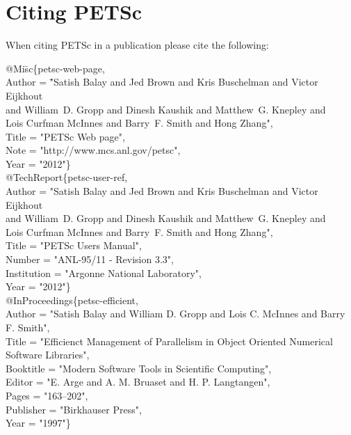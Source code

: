 
\section{Citing PETSc}

When citing PETSc in a publication please cite the following:
\begin{tabbing}

@Mi\=sc\{petsc-web-page,\\
   \>Author = \= "Satish Balay and Jed Brown and Kris Buschelman and Victor Eijkhout \\
\> \> and William~D. Gropp and Dinesh Kaushik and Matthew~G. Knepley and \\
\> \> Lois Curfman McInnes and Barry~F. Smith and Hong Zhang",\\
   \>Title  = "{PETS}c {W}eb page",\\
   \>Note   = "http://www.mcs.anl.gov/petsc",\\
   \>Year   = "2012"\}\\

@TechReport\{petsc-user-ref,\\
   \>Author      = "Satish Balay and Jed Brown and Kris Buschelman and Victor Eijkhout \\
\> \> and William~D. Gropp and Dinesh Kaushik and Matthew~G. Knepley and \\
\> \> Lois Curfman McInnes and Barry~F. Smith and Hong Zhang",\\
   \>Title       = "PETSc Users Manual",\\
   \>Number      = "ANL-95/11 - Revision 3.3",\\
   \>Institution = "Argonne National Laboratory",\\
   \>Year        = "2012"\}\\

@InProceedings\{petsc-efficient,\\
   \>Author    = "Satish Balay and William D. Gropp and Lois C. McInnes and Barry F. Smith",\\
   \>Title     = "Efficienct Management of Parallelism in Object Oriented Numerical Software Libraries",\\
   \>Booktitle = "Modern Software Tools in Scientific Computing",\\
   \>Editor    = "E. Arge and A. M. Bruaset and H. P. Langtangen",\\
   \>Pages     = "163--202",\\
   \>Publisher = "Birkhauser Press",\\
   \>Year      = "1997"\}
\end{tabbing}


